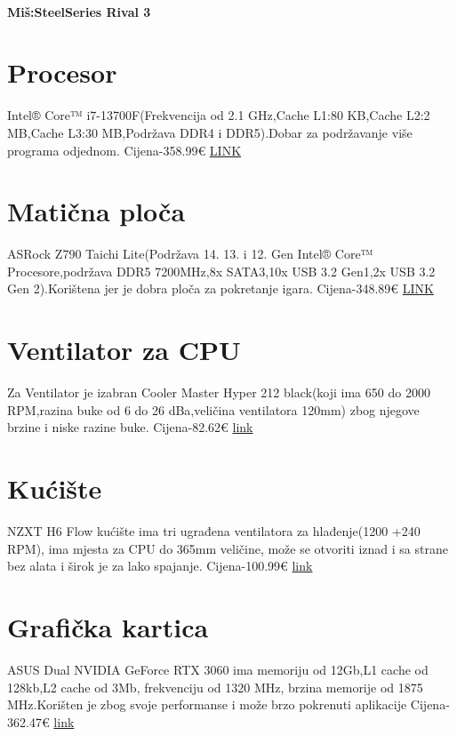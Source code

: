 \documentclass{article}
\begin{document}
\paragraph{\large{Miš:SteelSeries Rival 3}}

\paragraph{}


\section{\huge{Procesor}}
Intel® Core™ i7-13700F(Frekvencija od 2.1 GHz,Cache L1:80 KB,Cache L2:2 MB,Cache L3:30 MB,Podržava DDR4 i DDR5).Dobar za podržavanje više programa odjednom.
Cijena-358.99€
\href{https://www.cpubenchmark.net/cpu_value_available.html}{LINK}


\section{\huge{Matična ploča}}
ASRock Z790 Taichi Lite(Podržava 14. 13. i 12. Gen Intel® Core™ Procesore,podržava DDR5 7200MHz,8x SATA3,10x USB 3.2 Gen1,2x USB 3.2 Gen 2).Korištena jer je dobra ploča za pokretanje igara.
Cijena-348.89€ \href{https://www.tomshardware.com/reviews/asrock-z790-tiachi-lite-review}{LINK}




\section{\huge{Ventilator za CPU}}
Za Ventilator je izabran Cooler Master Hyper 212 black(koji ima 650 do 2000 RPM,razina buke od 6 do 26 dBa,veličina ventilatora 120mm) zbog njegove brzine i niske razine buke. Cijena-82.62€   \href{https://www.amazon.com/Cooler-Master-RR-212S-20PC-R1-Direct-Contact/dp/B07H22TC1N?th=1}{link}

\section{\huge{Kućište}}
NZXT H6 Flow kućište ima tri ugrađena ventilatora za hlađenje(1200 +240 RPM), ima mjesta za CPU do 365mm veličine, može se otvoriti iznad i sa strane bez alata i širok je za lako spajanje. Cijena-100.99€ \href{https://nzxt.com/product/h6-flow}{link}

\section{\huge{Grafička kartica}}
ASUS Dual NVIDIA GeForce RTX 3060 ima memoriju od 12Gb,L1 cache od 128kb,L2 cache od 3Mb, frekvenciju od 1320 MHz, brzina memorije od 1875 MHz.Korišten je zbog svoje performanse i može brzo pokrenuti aplikacije 
Cijena-362.47€ \href{https://www.amazon.com/ASUS-Graphics-DisplayPort-Axial-tech-Technology/dp/B08XNLLPY7}{link}
\end{document}

